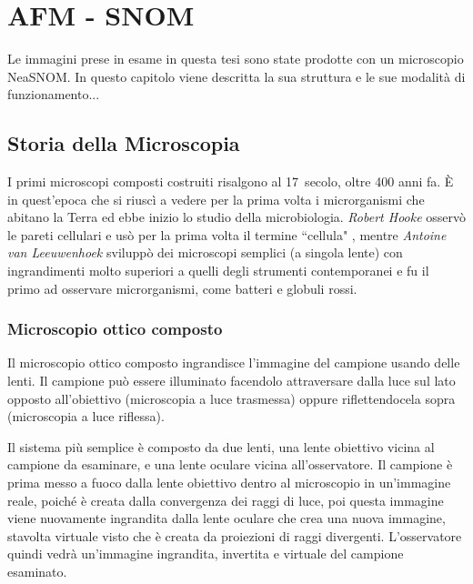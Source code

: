 \documentclass[../main.tex]{subfiles}
\begin{document}
\chapter{AFM - SNOM}
Le immagini prese in esame in questa tesi sono state prodotte con un microscopio NeaSNOM. In questo capitolo viene descritta la sua struttura e le sue modalità di funzionamento...
\section{Storia della Microscopia}

I primi microscopi composti costruiti risalgono al 17\textdegree\ secolo, oltre 400 anni fa. È in quest'epoca che si riuscì a vedere per la prima volta i microrganismi che abitano la Terra ed ebbe inizio lo studio della \gls{microbiologia}. \textit{Robert Hooke} osservò le pareti cellulari e usò per la prima volta il termine ``cellula" \cite{fara_2009, micrographia}, mentre \textit{Antoine van Leeuwenhoek} sviluppò dei microscopi semplici (a singola lente) con ingrandimenti molto superiori a quelli degli strumenti contemporanei e fu il primo ad osservare microrganismi, come batteri e globuli rossi.\cite{lane_2015, dobell_1923, corliss_1975, jessup_2024}

\subsection{Microscopio ottico composto}

Il microscopio ottico composto ingrandisce l'immagine del campione usando delle lenti. Il campione può essere illuminato facendolo attraversare dalla luce sul lato opposto all'obiettivo (microscopia a luce trasmessa) oppure riflettendocela sopra (microscopia a luce riflessa).

Il sistema più semplice è composto da due lenti, una lente obiettivo vicina al campione da esaminare, e una lente oculare vicina all'osservatore. Il campione è prima messo a fuoco dalla lente obiettivo dentro al microscopio in un'immagine reale, poiché è creata dalla convergenza dei raggi di luce, poi questa immagine viene nuovamente ingrandita dalla lente oculare che crea una nuova immagine, stavolta virtuale visto che è creata da proiezioni di raggi divergenti. L'osservatore quindi vedrà un'immagine ingrandita, invertita e virtuale del campione esaminato.
\end{document}
